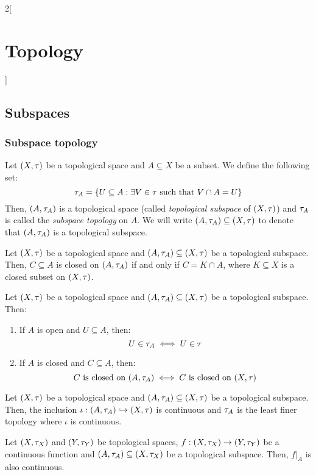 \documentclass[../../../main.tex]{subfiles}
\begin{document}
\begin{multicols}{2}[\section{Topology}]
  \subsection{Subspaces}
  \subsubsection{Subspace topology}
  \begin{definition}
    Let $(X,\tau)$ be a topological space and $A\subseteq X$ be a subset. We define the following set: $$\tau_A=\{U\subseteq A:\exists V\in\tau\text{ such that }V\cap A=U\}$$ Then, $(A,\tau_A)$ is a topological space (called \emph{topological subspace} of $(X,\tau)$) and $\tau_A$ is called the \emph{subspace topology} on $A$. We will write $(A,\tau_A)\subseteq (X,\tau)$ to denote that $(A,\tau_A)$ is a topological subspace.
  \end{definition}
  \begin{prop}
    Let $(X,\tau)$ be a topological space and $(A,\tau_A)\subseteq (X,\tau)$ be a topological subspace. Then, $C\subseteq A$ is closed on $(A,\tau_A)$ if and only if $C=K\cap A$, where $K\subseteq X$ is a closed subset on $(X,\tau)$.
  \end{prop}
  \begin{prop}
    Let $(X,\tau)$ be a topological space and $(A,\tau_A)\subseteq (X,\tau)$ be a topological subspace. Then:
    \begin{enumerate}
      \item If $A$ is open and $U\subseteq A$, then: $$U\in\tau_A\iff U\in\tau$$
      \item If $A$ is closed and $C\subseteq A$, then: $$C\text{ is closed on }(A,\tau_A)\iff C\text{ is closed on }(X,\tau)$$
    \end{enumerate}
  \end{prop}
  \begin{prop}
    Let $(X,\tau)$ be a topological space and $(A,\tau_A)\subseteq (X,\tau)$ be a topological subspace. Then, the inclusion $\iota:(A,\tau_A)\hookrightarrow (X,\tau)$ is continuous and $\tau_A$ is the least finer topology where $\iota$ is continuous.
  \end{prop}
  \begin{corollary}
    Let $(X,\tau_X)$ and $(Y,\tau_Y)$ be topological spaces, $f:(X,\tau_X)\rightarrow (Y,\tau_Y)$ be a continuous function and $(A,\tau_A)\subseteq (X,\tau_X)$ be a topological subspace. Then, $f|_A$ is also continuous.
  \end{corollary}

\end{multicols}
\end{document}
